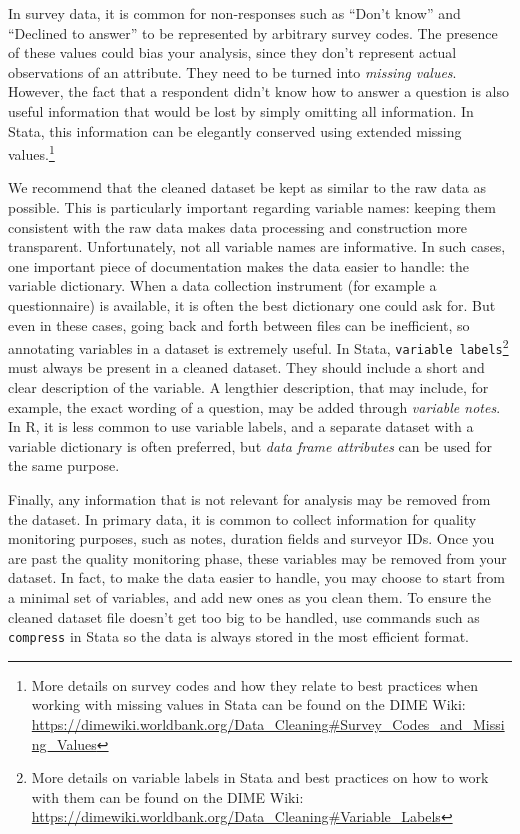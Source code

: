 \documentclass[
]{book}
\begin{document}
In survey data, it is common for non-responses such as ``Don't know'' and ``Declined to answer''
to be represented by arbitrary survey codes.
The presence of these values could bias your analysis,
since they don't represent actual observations of an attribute.
They need to be turned into \emph{missing values}.
However, the fact that a respondent didn't know how to answer a question is also useful information
that would be lost by simply omitting all information.
In Stata, this information can be elegantly conserved using extended missing values.\footnote{More details on survey codes
  and how they relate to best practices when working with missing values in Stata
  can be found on the DIME Wiki:
  \url{https://dimewiki.worldbank.org/Data_Cleaning\#Survey_Codes_and_Missing_Values}}

We recommend that the cleaned dataset be kept as similar to the raw data as possible.
This is particularly important regarding variable names:
keeping them consistent with the raw data makes data processing and construction more transparent.
Unfortunately, not all variable names are informative.
In such cases, one important piece of documentation
makes the data easier to handle: the variable dictionary.
When a data collection instrument (for example a questionnaire) is available,
it is often the best dictionary one could ask for.
But even in these cases, going back and forth between files can be inefficient,
so annotating variables in a dataset is extremely useful.
In Stata, \texttt{variable\ labels}\footnote{More details on variable labels in Stata
  and best practices on how to work with them
  can be found on the DIME Wiki:
  \url{https://dimewiki.worldbank.org/Data_Cleaning\#Variable_Labels}}
must always be present in a cleaned dataset.
They should include a short and clear description of the variable.
A lengthier description, that may include, for example,
the exact wording of a question, may be added through \emph{variable notes}.
In R, it is less common to use variable labels,
and a separate dataset with a variable dictionary is often preferred,
but \emph{data frame attributes} can be used for the same purpose.

Finally, any information that is not relevant for analysis may be removed from the dataset.
In primary data, it is common to collect information for quality monitoring purposes,
such as notes, duration fields and surveyor IDs.
Once you are past the quality monitoring phase,
these variables may be removed from your dataset.
In fact, to make the data easier to handle,
you may choose to start from a minimal set of variables,
and add new ones as you clean them.
To ensure the cleaned dataset file doesn't get too big to be handled,
use commands such as \texttt{compress} in Stata so the data
is always stored in the most efficient format.
\end{document}
